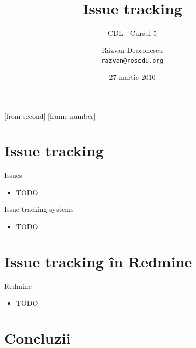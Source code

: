 \documentclass{beamer}
\title[Issue tracking]{Issue tracking}
\subtitle{CDL - Cursul 5}
\institute[ROSEdu]{ROSEdu}
\date{27 martie 2010}
\author{Răzvan Deaconescu \\ \texttt{razvan@rosedu.org}}
\begin{document}
[from second]
[frame number]

\frame{\titlepage}

\frame{\tableofcontents}


\section{Issue tracking}

\frame{\tableofcontents[currentsection]}


\begin{frame}{Issues}
  \begin{itemize}
    \item TODO
  \end{itemize}
\end{frame}

\begin{frame}{Issue tracking systems}
  \begin{itemize}
    \item TODO
  \end{itemize}
\end{frame}


\section{Issue tracking în Redmine}

\frame{\tableofcontents[currentsection]}

\begin{frame}{Redmine}
  \begin{itemize}
    \item TODO
  \end{itemize}
\end{frame}


\section{Concluzii}

\frame{\tableofcontents[currentsection]}
\end{document}
